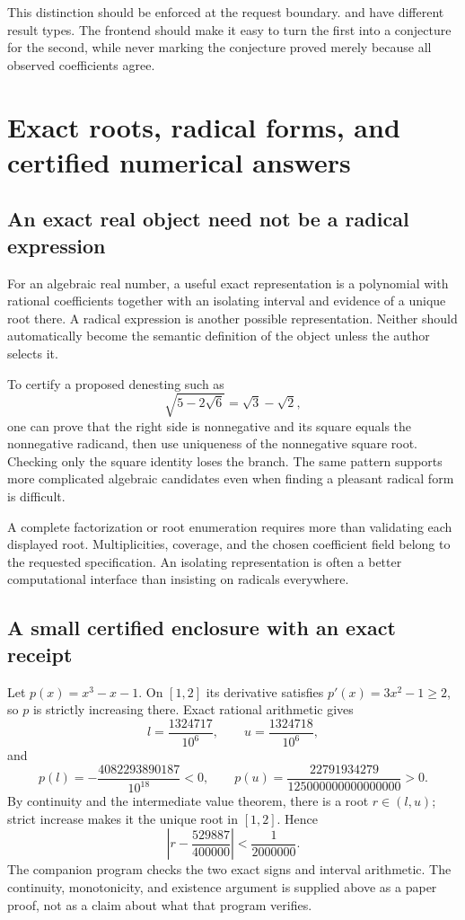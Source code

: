 \documentclass[11pt,a4paper]{article}
\newcommand{\code}[1]{\texttt{\detokenize{#1}}}
\theoremstyle{definition}
\theoremstyle{remark}
\begin{document}
This distinction should be enforced at the request boundary. \code{expand F to 20} and \code{prove F = G} have different result types. The frontend should make it easy to turn the first into a conjecture for the second, while never marking the conjecture proved merely because all observed coefficients agree.

\section{Exact roots, radical forms, and certified numerical answers}\label{sec:numerics}
\subsection{An exact real object need not be a radical expression}
For an algebraic real number, a useful exact representation is a polynomial with rational coefficients together with an isolating interval and evidence of a unique root there. A radical expression is another possible representation. Neither should automatically become the semantic definition of the object unless the author selects it.

To certify a proposed denesting such as
\[
\sqrt{5-2\sqrt6}=\sqrt3-\sqrt2,
\]
one can prove that the right side is nonnegative and its square equals the nonnegative radicand, then use uniqueness of the nonnegative square root. Checking only the square identity loses the branch. The same pattern supports more complicated algebraic candidates even when finding a pleasant radical form is difficult.

A complete factorization or root enumeration requires more than validating each displayed root. Multiplicities, coverage, and the chosen coefficient field belong to the requested specification. An isolating representation is often a better computational interface than insisting on radicals everywhere.

\subsection{A small certified enclosure with an exact receipt}
Let $p(x)=x^3-x-1$. On $[1,2]$ its derivative satisfies $p'(x)=3x^2-1\ge2$, so $p$ is strictly increasing there. Exact rational arithmetic gives
\[
l=\frac{1324717}{10^6},\qquad u=\frac{1324718}{10^6},
\]
and
\[
p(l)=-\frac{4082293890187}{10^{18}}<0,
\qquad
p(u)=\frac{22791934279}{125000000000000000}>0.
\]
By continuity and the intermediate value theorem, there is a root $r\in(l,u)$; strict increase makes it the unique root in $[1,2]$. Hence
\[
\left|r-\frac{529887}{400000}\right|<\frac1{2000000}.
\]
The companion program checks the two exact signs and interval arithmetic. The continuity, monotonicity, and existence argument is supplied above as a paper proof, not as a claim about what that program verifies.
\end{document}
